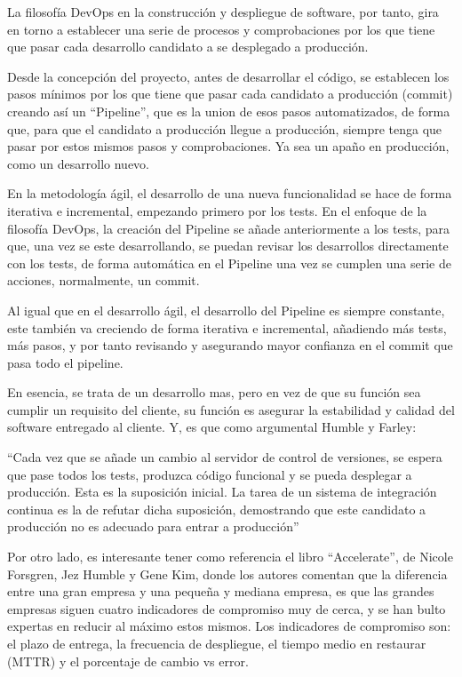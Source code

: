\documentclass[12pt]{report} %
\begin{document}
La filosofía DevOps en la construcción y despliegue de software, por tanto, gira
en torno a establecer una serie de procesos y comprobaciones por los que tiene
que pasar cada desarrollo candidato a se desplegado a producción. 

Desde la concepción del proyecto, antes de desarrollar el código, se establecen
los pasos mínimos por los que tiene que pasar cada candidato a producción
(commit) creando así un ``Pipeline'', que es la union de esos pasos
automatizados, de forma que, para que el candidato a producción llegue a
producción, siempre tenga que pasar por estos mismos pasos y comprobaciones.  Ya
sea un apaño en producción, como un desarrollo nuevo.

En la metodología ágil, el desarrollo de una nueva funcionalidad se hace de
forma iterativa e incremental, empezando primero por los tests.  En el enfoque
de la filosofía DevOps, la creación del Pipeline se añade anteriormente a los
tests, para que, una vez se este desarrollando, se puedan revisar los
desarrollos directamente con los tests, de forma automática en el Pipeline una
vez se cumplen una serie de acciones, normalmente, un commit.

Al igual que en el desarrollo ágil, el desarrollo del Pipeline es siempre
constante, este también va creciendo de forma iterativa e incremental, añadiendo
más tests, más pasos, y por tanto revisando y asegurando mayor confianza en el
commit que pasa todo el pipeline.

En esencia, se trata de un desarrollo mas, pero en vez de que su función sea
cumplir un requisito del cliente, su función es asegurar la estabilidad y
calidad del software entregado al cliente. Y, es que como argumental Humble y
Farley: 

``Cada vez que se añade un cambio al servidor de control de versiones, se espera
que pase todos los tests, produzca código funcional y se pueda desplegar a
producción.  Esta es la suposición inicial.  La tarea de un sistema de
integración continua es la de refutar dicha suposición, demostrando que este
candidato a producción no es adecuado para entrar a
producción''\cite{Humble2010}

Por otro lado, es interesante tener como referencia el libro ``Accelerate'', de
Nicole Forsgren, Jez Humble y Gene Kim, donde los autores comentan que la
diferencia entre una gran empresa y una pequeña y mediana empresa, es que las
grandes empresas siguen cuatro indicadores de compromiso muy de cerca, y se han
bulto expertas en reducir al máximo estos mismos.  Los indicadores de compromiso
son: el plazo de entrega, la frecuencia de despliegue, el tiempo medio en
restaurar (MTTR) y el porcentaje de cambio vs error.\cite{Forsgren2018}
\end{document}
